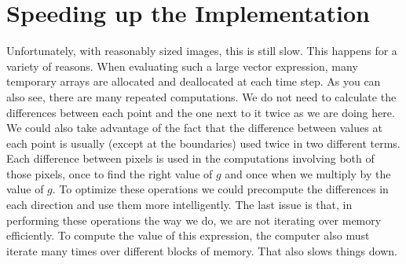 \section*{Speeding up the Implementation}
Unfortunately, with reasonably sized images, this is still slow.
This happens for a variety of reasons.
When evaluating such a large vector expression, many temporary arrays are allocated and deallocated at each time step.
As you can also see, there are many repeated computations.
We do not need to calculate the differences between each point and the one next to it twice as we are doing here.
We could also take advantage of the fact that the difference between values at each point is usually (except at the boundaries) used twice in two different terms.
Each difference between pixels is used in the computations involving both of those pixels, once to find the right value of $g$ and once when we multiply by the value of $g$.
To optimize these operations we could precompute the differences in each direction and use them more intelligently.
The last issue is that, in performing these operations the way we do, we are not iterating over memory efficiently.
To compute the value of this expression, the computer also must iterate many times over different blocks of memory.
That also slows things down.

